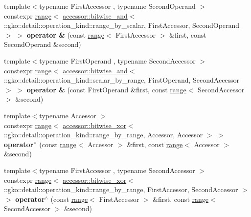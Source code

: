 \begin{DoxyCompactItemize}
\item 
\mbox{\label{namespacegko_a80be284fcb9f67ece7e63fd6f030b6b4}} 
{\footnotesize template$<$typename First\+Accessor , typename Second\+Operand $>$ }\\constexpr \hyperlink{classgko_1_1range}{range}$<$ \hyperlink{structgko_1_1accessor_1_1bitwise__and}{accessor\+::bitwise\+\_\+and}$<$ \+::gko\+::detail\+::operation\+\_\+kind\+::range\+\_\+by\+\_\+scalar, First\+Accessor, Second\+Operand $>$ $>$ {\bfseries operator \&} (const \hyperlink{classgko_1_1range}{range}$<$ First\+Accessor $>$ \&first, const Second\+Operand \&second)
\item 
\mbox{\label{namespacegko_af137259d04ea41e3c6701633acab501c}} 
{\footnotesize template$<$typename First\+Operand , typename Second\+Accessor $>$ }\\constexpr \hyperlink{classgko_1_1range}{range}$<$ \hyperlink{structgko_1_1accessor_1_1bitwise__and}{accessor\+::bitwise\+\_\+and}$<$ \+::gko\+::detail\+::operation\+\_\+kind\+::scalar\+\_\+by\+\_\+range, First\+Operand, Second\+Accessor $>$ $>$ {\bfseries operator \&} (const First\+Operand \&first, const \hyperlink{classgko_1_1range}{range}$<$ Second\+Accessor $>$ \&second)
\item 
\mbox{\label{namespacegko_a9632339715461aa398490e01ff0061c1}} 
{\footnotesize template$<$typename Accessor $>$ }\\constexpr \hyperlink{classgko_1_1range}{range}$<$ \hyperlink{structgko_1_1accessor_1_1bitwise__xor}{accessor\+::bitwise\+\_\+xor}$<$ \+::gko\+::detail\+::operation\+\_\+kind\+::range\+\_\+by\+\_\+range, Accessor, Accessor $>$ $>$ {\bfseries operator$^\wedge$} (const \hyperlink{classgko_1_1range}{range}$<$ Accessor $>$ \&first, const \hyperlink{classgko_1_1range}{range}$<$ Accessor $>$ \&second)
\item 
\mbox{\label{namespacegko_aa283184871e7e3c2732eee8d5730a58f}} 
{\footnotesize template$<$typename First\+Accessor , typename Second\+Accessor $>$ }\\constexpr \hyperlink{classgko_1_1range}{range}$<$ \hyperlink{structgko_1_1accessor_1_1bitwise__xor}{accessor\+::bitwise\+\_\+xor}$<$ \+::gko\+::detail\+::operation\+\_\+kind\+::range\+\_\+by\+\_\+range, First\+Accessor, Second\+Accessor $>$ $>$ {\bfseries operator$^\wedge$} (const \hyperlink{classgko_1_1range}{range}$<$ First\+Accessor $>$ \&first, const \hyperlink{classgko_1_1range}{range}$<$ Second\+Accessor $>$ \&second)

\end{DoxyCompactItemize}
